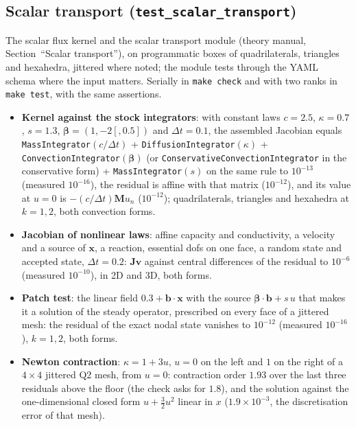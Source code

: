 \documentclass[11pt]{article}
\newcommand{\bx}{\bm{x}}
\newcommand{\bM}{\bm{M}}
\DeclareRobustCommand{\code}[1]{{\def\_{\textunderscore\allowbreak}\texttt{#1}}}
\begin{document}
\subsection{Scalar transport (\texttt{test\_scalar\_transport})}
\label{sec:testscalar}
The scalar flux kernel and the scalar transport module (theory manual,
Section~``Scalar transport''), on programmatic boxes of quadrilaterals,
triangles and hexahedra, jittered where noted; the module tests through the
YAML schema where the input matters.  Serially in \code{make check} and
with two ranks in \code{make test}, with the same assertions.
\begin{itemize}[nosep]
  \item \textbf{Kernel against the stock integrators}: with constant laws
    $c = 2.5$, $\kappa = 0.7$, $s = 1.3$, $\bm\beta = (1, -2[, 0.5])$ and
    $\Delta t = 0.1$, the assembled Jacobian equals
    \code{MassIntegrator}$(c/\Delta t)$ + \code{DiffusionIntegrator}$(\kappa)$
    + \code{ConvectionIntegrator}$(\bm\beta)$ (or
    \code{ConservativeConvectionIntegrator} in the conservative form) +
    \code{MassIntegrator}$(s)$ on the same rule to $10^{-13}$ (measured
    $10^{-16}$), the residual is affine with that matrix ($10^{-12}$), and
    its value at $u = 0$ is $-(c/\Delta t)\bM u_n$ ($10^{-12}$); quadrilaterals,
    triangles and hexahedra at $k = 1, 2$, both convection forms.
  \item \textbf{Jacobian of nonlinear laws}: affine capacity and
    conductivity, a velocity and a source of $\bx$, a reaction, essential
    dofs on one face, a random state and accepted state, $\Delta t = 0.2$:
    $\bm J\bm v$ against central differences of the residual to $10^{-6}$
    (measured $10^{-10}$), in 2D and 3D, both forms.
  \item \textbf{Patch test}: the linear field $0.3 + \bm b\cdot\bx$ with the
    source $\bm\beta\cdot\bm b + s\,u$ that makes it a solution of the steady
    operator, prescribed on every face of a jittered mesh: the residual of
    the exact nodal state vanishes to $10^{-12}$ (measured $10^{-16}$),
    $k = 1, 2$, both forms.
  \item \textbf{Newton contraction}: $\kappa = 1 + 3u$, $u = 0$ on the
    left and $1$ on the right of a $4\times4$ jittered Q2 mesh, from
    $u = 0$: contraction order $1.93$ over the last three residuals above
    the floor (the check asks for $1.8$), and the solution against the
    one-dimensional closed form $u + \tfrac32 u^2$ linear in $x$
    ($1.9\times10^{-3}$, the discretisation error of that mesh).

\end{itemize}
\end{document}
